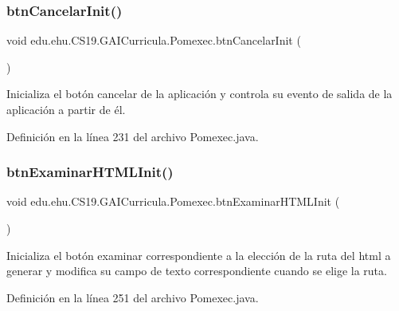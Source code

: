 \mbox{\label{a00029_adddaf261f4abfb185dbaff370be28bef}} 
\subsubsection{\texorpdfstring{btnCancelarInit()}{btnCancelarInit()}}
{\footnotesize\ttfamily void edu.\+ehu.\+C\+S19.\+G\+A\+I\+Curricula.\+Pomexec.\+btn\+Cancelar\+Init (\begin{DoxyParamCaption}{ }\end{DoxyParamCaption})}



Inicializa el botón cancelar de la aplicación y controla su evento de salida de la aplicación a partir de él. 



Definición en la línea 231 del archivo Pomexec.\+java.

\mbox{\label{a00029_aec83fb7dda0b4f2fdfc404ba2330b37a}} 
\subsubsection{\texorpdfstring{btnExaminarHTMLInit()}{btnExaminarHTMLInit()}}
{\footnotesize\ttfamily void edu.\+ehu.\+C\+S19.\+G\+A\+I\+Curricula.\+Pomexec.\+btn\+Examinar\+H\+T\+M\+L\+Init (\begin{DoxyParamCaption}{ }\end{DoxyParamCaption})}



Inicializa el botón examinar correspondiente a la elección de la ruta del html a generar y modifica su campo de texto correspondiente cuando se elige la ruta. 



Definición en la línea 251 del archivo Pomexec.\+java.

\mbox{\label{a00029_a8e25f512501551f46bb24a415036f15b}} 

